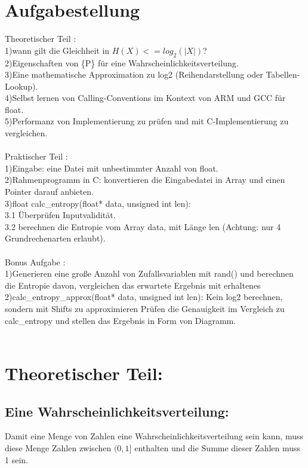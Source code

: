 \documentclass[11pt]{article}
\begin{document}
\section{Aufgabestellung} 
{\color{red} Theoretischer Teil :} \\
 1)wann gilt die Gleichheit in $H(X)<= log_2{(|X|)}$?\\
 2)Eigenschaften von \{P\} f\"ur eine Wahrscheinlichkeitsverteilung.\\
3)Eine mathematische Approximation zu log2 (Reihendarstellung oder Tabellen-Lookup).\\
4)Selbst lernen von Calling-Conventions im Kontext von ARM und GCC f\"ur float.\\
5)Performanz von Implementierung zu pr\"ufen und mit C-Implementierung zu vergleichen.\\\\
{\color{red} Praktischer Teil :}\\
1)Eingabe: eine Datei mit unbestimmter Anzahl von float.\\
2)Rahmenprogramm in C: konvertieren die Eingabedatei in Array und einen Pointer darauf anbieten.\\
3)float calc\_entropy(float* data, unsigned int len):\\
3.1 \"Uberpr\"ufen Inputvalidit\"at.\\ 
3.2 berechnen die Entropie vom Array data, mit L\"ange len  (Achtung: nur 4 Grundrechenarten erlaubt).\\\\
{\color{red} Bonus Aufgabe :}\\
1)Generieren eine große Anzahl von Zufallsvariablen mit rand() und berechnen die  Entropie davon, vergleichen das erwartete Ergebnis mit erhaltenes \\
2)calc\_entropy\_approx(float* data, unsigned int len):  Kein log2 berechnen, sondern mit Shifts zu approximieren  Pr\"ufen die Genauigkeit im Vergleich zu calc\_entropy und stellen das Ergebnis in Form von Diagramm.\\\\

\section{Theoretischer Teil:}
\begin{Large}
\end{Large}
\subsection{Eine Wahrscheinlichkeitsverteilung:}
\begin{large}

Damit eine Menge von Zahlen eine Wahrscheinlichkeitsverteilung sein kann, muss diese Menge Zahlen zwischen $(0,1]$ enthalten und die Summe dieser Zahlen muss 1 sein. \\
\end{large} 
\end{document}
